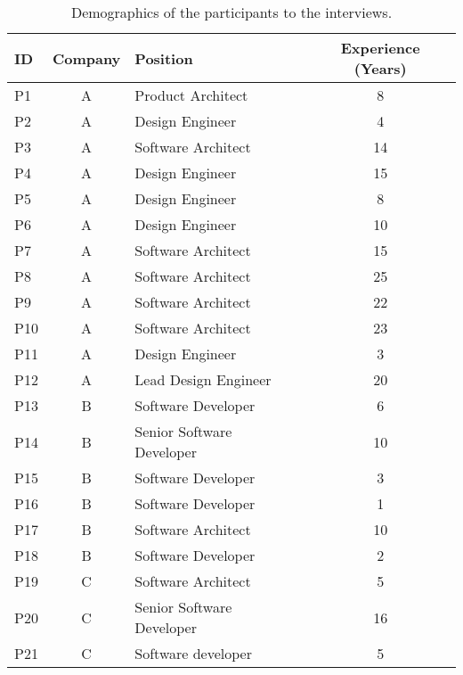 \begin{table}[h!]
    \centering
    \footnotesize
    \caption{Demographics of the participants to the interviews.}
    \label{c3:tab:participants}
    \begin{tabular}{lclc}
    \toprule
    ID & Company & Position & Experience (Years)\\ \midrule
    P1 & A & Product Architect & 8 \\
    P2 & A & Design Engineer & 4 \\
    P3 & A & Software Architect & 14 \\
    P4 & A & Design Engineer & 15 \\
    P5 & A & Design Engineer & 8 \\
    P6 & A & Design Engineer & 10 \\
    P7 & A & Software Architect & 15 \\
    P8 & A & Software Architect & 25 \\
    P9 & A & Software Architect & 22 \\
    P10 & A & Software Architect & 23 \\
    P11 & A & Design Engineer & 3 \\
    P12 & A & Lead Design Engineer & 20 \\
    P13 & B & Software Developer & 6 \\
    P14 & B & Senior Software Developer & 10 \\
    P15 & B & Software Developer & 3 \\
    P16 & B & Software Developer & 1 \\
    P17 & B & Software Architect & 10 \\
    P18 & B & Software Developer & 2 \\
    P19 & C & Software Architect & 5 \\
    P20 & C & Senior Software Developer & 16 \\
    P21 & C & Software developer & 5 \\ \bottomrule
    \end{tabular}
\end{table}

